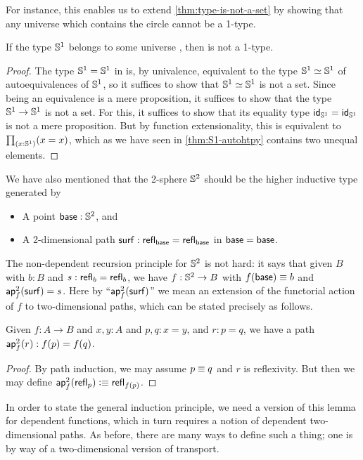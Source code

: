 For instance, this enables us to extend \autoref{thm:type-is-not-a-set} by showing that any universe which contains the circle cannot be a 1-type.

\begin{cor}
  If the type $\Sn^1$ belongs to some universe \type, then \type is not a 1-type.
\end{cor}
\begin{proof}
  The type $\Sn^1=\Sn^1$ in \type is, by univalence, equivalent to the type $\eqv{\Sn^1}{\Sn^1}$ of auto\-equivalences of $\Sn^1$, so it suffices to show that $\eqv{\Sn^1}{\Sn^1}$ is not a set.
  Since being an equivalence is a mere proposition, it suffices to show that the type ${\Sn^1}\to{\Sn^1}$ is not a set.
  For this, it suffices to show that its equality type $\idfunc[\Sn^1] = \idfunc[\Sn^1]$ is not a mere proposition.
  But by function extensionality, this is equivalent to $\prd{x:\Sn^1} (x=x)$, which as we have seen in \autoref{thm:S1-autohtpy} contains two unequal elements.
\end{proof}

%
%
We have also mentioned that the 2-sphere $\Sn^2$ should be the higher inductive type generated by
\begin{itemize}
\item A point $\base:\Sn^2$, and
\item A 2-dimensional path $\surf:\refl{\base} = \refl{\base}$ in ${\base=\base}$.
\end{itemize}
%
The non-dependent recursion principle for $\Sn^2$ is not hard: it says that given $B$ with $b:B$ and $s:\refl b = \refl b$, we have $f:\Sn^2\to B$ with $f(\base)\jdeq b$ and $\aptwo f \surf = s$.
Here by ``$\aptwo f \surf$'' we mean an extension of the functorial action of $f$ to two-dimensional paths, which can be stated precisely as follows.

\begin{lem}\label{thm:ap2}
  Given $f:A\to B$ and $x,y:A$ and $p,q:x=y$, and $r:p=q$, we have a path $\aptwo f r : \ap f p = \ap f q$.
\end{lem}
\begin{proof}
  By path induction, we may assume $p\jdeq q$ and $r$ is reflexivity.
  But then we may define $\aptwo f {\refl p} \defeq \refl{\ap f p}$.
\end{proof}

In order to state the general induction principle, we need a version of this lemma for dependent functions, which in turn requires a notion of dependent two-dimensional paths.
As before, there are many ways to define such a thing; one is by way of a two-dimensional version of transport.

